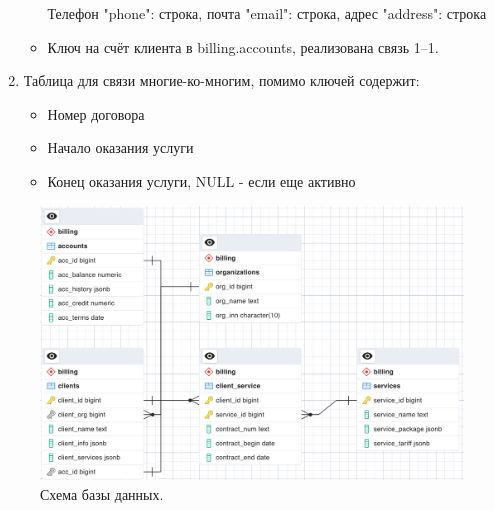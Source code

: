 \documentclass[oneside,senior,etd]{BYUPhysForDegree}
\begin{document}
\begin{enumerate}
\begin{itemize}
        Телефон "phone": строка, почта "email": строка, адрес "address": строка
        \item Ключ на счёт клиента в billing.accounts, реализована связь 1--1.
    \end{itemize}
    \item Таблица для связи многие-ко-многим, помимо ключей содержит: \begin{itemize}
        \item Номер договора
        \item Начало оказания услуги
        \item Конец оказания услуги, NULL - если еще активно
    \end{itemize}

\end{enumerate}
\begin{figure}[hbt!]
    \centering
    \includegraphics[width=1.0\linewidth]{scheme.png}
    \caption{Схема базы данных.}
    \label{fig:scheme}
\end{figure}
\end{document}
